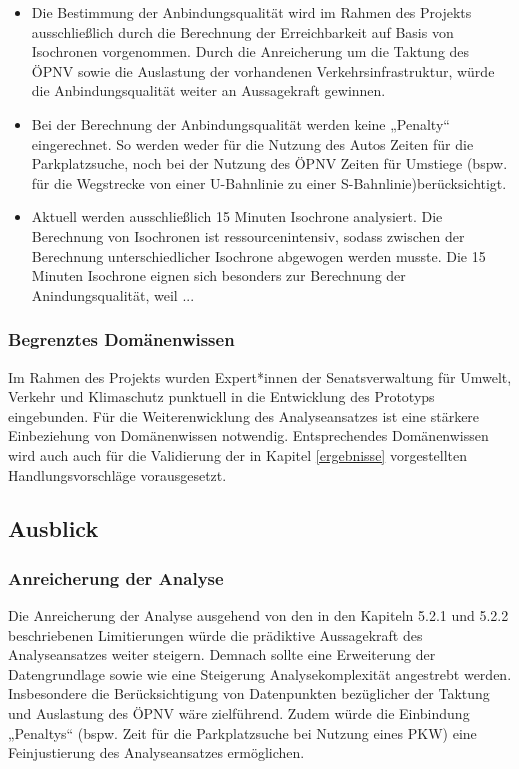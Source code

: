 \begin{itemize}

    \item Die Bestimmung der Anbindungsqualität wird im Rahmen des Projekts ausschließlich durch die Berechnung der Erreichbarkeit auf Basis von Isochronen vorgenommen. Durch die Anreicherung um die Taktung des ÖPNV sowie die Auslastung der vorhandenen Verkehrsinfrastruktur, würde die Anbindungsqualität weiter an Aussagekraft gewinnen.

    \item Bei der Berechnung der Anbindungsqualität werden keine „Penalty“ eingerechnet. So werden weder für die Nutzung des Autos Zeiten für die Parkplatzsuche, noch bei der Nutzung des ÖPNV Zeiten für Umstiege (bspw. für die Wegstrecke von einer U-Bahnlinie zu einer S-Bahnlinie)berücksichtigt.
    \item Aktuell werden ausschließlich 15 Minuten Isochrone analysiert​. Die Berechnung von Isochronen ist ressourcenintensiv, sodass zwischen der Berechnung unterschiedlicher Isochrone abgewogen werden musste. Die 15 Minuten Isochrone eignen sich besonders zur Berechnung der Anindungsqualität, weil ...
\end{itemize}


\subsubsection{Begrenztes Domänenwissen}
Im Rahmen des Projekts wurden Expert*innen der Senatsverwaltung für Umwelt, Verkehr und Klimaschutz punktuell in die Entwicklung des Prototyps eingebunden. Für die Weiterenwicklung des Analyseansatzes ist eine stärkere Einbeziehung von Domänenwissen notwendig. Entsprechendes Domänenwissen wird auch auch für die Validierung der in Kapitel \ref{ergebnisse} vorgestellten Handlungsvorschläge vorausgesetzt.


\subsection{Ausblick}

\subsubsection{Anreicherung der Analyse}
Die Anreicherung der Analyse ausgehend von den in den Kapiteln 5.2.1 und 5.2.2 beschriebenen Limitierungen würde die prädiktive Aussagekraft des Analyseansatzes weiter steigern. Demnach sollte eine Erweiterung der Datengrundlage sowie wie eine Steigerung Analysekomplexität angestrebt werden. Insbesondere die Berücksichtigung von Datenpunkten bezüglicher der Taktung und Auslastung des ÖPNV wäre zielführend. Zudem würde die Einbindung „Penaltys“ (bspw. Zeit für die Parkplatzsuche bei Nutzung eines PKW) eine Feinjustierung des Analyseansatzes ermöglichen.

